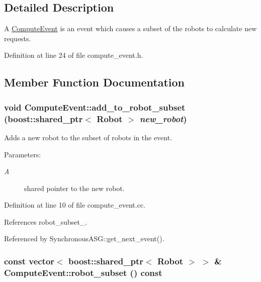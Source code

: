 \subsection{Detailed Description}
A \hyperlink{class_compute_event}{ComputeEvent} is an event which causes a subset of the robots to calculate new requests. 

Definition at line 24 of file compute\_\-event.h.

\subsection{Member Function Documentation}
\hypertarget{class_compute_event_7268b70a949c8e9fb1116a1ced0e0071}{
\subsubsection[add\_\-to\_\-robot\_\-subset]{\setlength{\rightskip}{0pt plus 5cm}void ComputeEvent::add\_\-to\_\-robot\_\-subset (boost::shared\_\-ptr$<$ Robot $>$ {\em new\_\-robot})}}
\label{class_compute_event_7268b70a949c8e9fb1116a1ced0e0071}


Adds a new robot to the subset of robots in the event. \begin{Desc}
\item[Parameters:]
\begin{description}
\item[{\em A}]shared pointer to the new robot. \end{description}
\end{Desc}


Definition at line 10 of file compute\_\-event.cc.

References robot\_\-subset\_\-.

Referenced by SynchronousASG::get\_\-next\_\-event().\hypertarget{class_compute_event_ab47f53949412a2ae5f182206aebf438}{
\subsubsection[robot\_\-subset]{\setlength{\rightskip}{0pt plus 5cm}const vector$<$ boost::shared\_\-ptr$<$ Robot $>$ $>$ \& ComputeEvent::robot\_\-subset () const}}
\label{class_compute_event_ab47f53949412a2ae5f182206aebf438}



